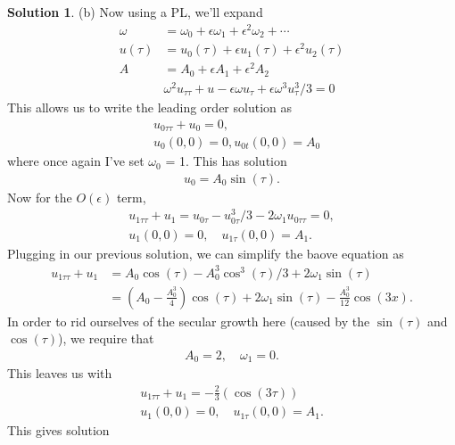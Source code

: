 \documentclass[12pt]{article}
\theoremstyle{definition}
\newtheorem{sol}{Solution}
\theoremstyle{remark}
\begin{document}
\begin{sol}
    (b) Now using a PL, we'll expand 
    \begin{align*}
       \omega &= \omega_{0} + \epsilon \omega_{1} + \epsilon^{2}  \omega_{2} + \cdots\\
    u(\tau) &= u_{0}(\tau) + \epsilon u_{1}(\tau) + \epsilon^{2} u_{2}(\tau) \\
    A &= A_{0} + \epsilon A_{1} + \epsilon^{2} A_{2}\\
           &\omega^{2} u_{\tau \tau} + u - \epsilon \omega u_{\tau}+ \epsilon \omega^{3}u_{\tau}^{3} / 3 = 0
    \end{align*}
    This allows us to write the leading order solution as
    \begin{align*}
        &u_{0\tau \tau} + u_{0} = 0,\\
        &u_{0}(0,0) = 0, u_{0t}(0,0) = A_{0}
    \end{align*}
    where once again I've set $\omega_{0}$ = 1. This has solution
    \begin{align*}
        u_{0} = A_{0} \sin(\tau) .
    \end{align*}
    Now for the $O(\epsilon)$ term,
    \begin{align*}
    u_{1 \tau \tau} + u_{1} =  u_{0\tau} - u_{0\tau}^{3} / 3  - 2 \omega_{1} u_{0\tau \tau}= 0,\\
    u_{1}(0,0) = 0, \quad u_{1 \tau}(0,0) = A_{1}.
    \end{align*}
    Plugging in our previous solution, we can simplify the baove equation as
    \begin{align*}
        u_{1 \tau \tau} + u_{1} &= A_{0} \cos(\tau) - A_{0}^{3} \cos^{3}(\tau) / 3 + 2 \omega_{1} \sin(\tau)\\
                                &= \left(A_{0} - \frac{A_{0}^{3}}{4}\right ) \cos(\tau) + 2 \omega_{1} \sin(\tau) - \frac{A_{0}^{3}}{12} \cos(3x).
\end{align*}
In order to rid ourselves of the secular growth here (caused by the $\sin(\tau)$ and $\cos(\tau)$), we require that
    \begin{align*}
    A_{0} = 2, \quad \omega_{1} = 0.
    \end{align*}
    This leaves us with 
    \begin{align*}
        u_{1 \tau \tau} + u_{1} = - \frac{2}{3} \left(\cos(3\tau) \right) \\
            u_{1}(0,0) = 0, \quad u_{1 \tau}(0,0) = A_{1}.
    \end{align*}
    This gives solution
\begin{equation*}

\end{equation*}
\end{sol}
\end{document}
